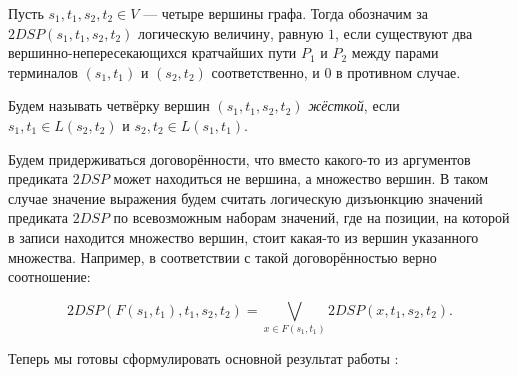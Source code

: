 \begin{definition}
Пусть $s_1, t_1, s_2, t_2 \in V$ --- четыре вершины графа. Тогда обозначим за $2DSP(s_1, t_1, s_2, t_2)$ логическую величину, равную $1$, если существуют два вершинно-непересекающихся кратчайших пути $P_1$ и $P_2$ между парами терминалов $(s_1, t_1)$ и $(s_2, t_2)$ соответственно, и $0$ в противном случае.
\end{definition}

\begin{definition}
Будем называть четвёрку вершин $(s_1, t_1, s_2, t_2)$ \textit{жёсткой}, если $s_1, t_1 \in L(s_2, t_2)$ и $s_2, t_2 \in L(s_1, t_1)$.
\end{definition}

Будем придерживаться договорённости, что вместо какого-то из аргументов предиката $2DSP$ может находиться не вершина, а множество вершин. В таком случае значение выражения будем считать логическую дизъюнкцию значений предиката $2DSP$ по всевозможным наборам значений, где на позиции, на которой в записи находится множество вершин, стоит какая-то из вершин указанного множества. Например, в соответствии с такой договорённостью верно соотношение: 

\begin{equation}
2DSP(F(s_1, t_1), t_1, s_2, t_2) = \bigvee\limits_{x \in F(s_1, t_1)} 2DSP(x, t_1, s_2, t_2).
\end{equation}

Теперь мы готовы сформулировать основной результат работы \cite{ET}:

